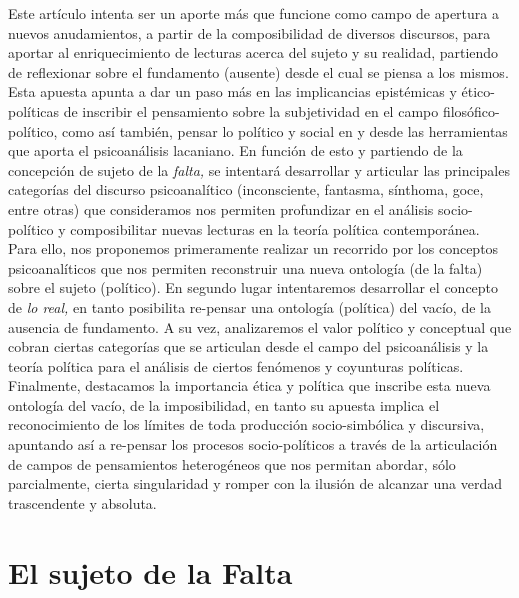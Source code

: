 Este artículo intenta ser un aporte más que funcione como campo de apertura a nuevos anudamientos, a partir de la composibilidad de diversos discursos, para aportar al enriquecimiento de lecturas acerca del sujeto y su realidad, partiendo de reflexionar sobre el fundamento (ausente) desde el cual se piensa a los mismos. Esta apuesta apunta a dar un paso más en las implicancias epistémicas y ético-políticas de inscribir el pensamiento sobre la subjetividad en el campo filosófico-político, como así también, pensar lo político y social en y desde las herramientas que aporta el psicoanálisis lacaniano. En función de esto y partiendo de la concepción de sujeto de la \emph{falta,} se intentará desarrollar y articular las principales categorías del discurso psicoanalítico (inconsciente, fantasma, sínthoma, goce, entre otras) que consideramos nos permiten profundizar en el análisis socio-político y composibilitar nuevas lecturas en la teoría política contemporánea. Para ello, nos proponemos primeramente realizar un recorrido por los conceptos psicoanalíticos que nos permiten reconstruir una nueva ontología (de la falta) sobre el sujeto (político). En segundo lugar intentaremos desarrollar el concepto de \emph{lo real,} en tanto posibilita re-pensar una ontología (política) del vacío, de la ausencia de fundamento. A su vez, analizaremos el valor político y conceptual que cobran ciertas categorías que se articulan desde el campo del psicoanálisis y la teoría política para el análisis de ciertos fenómenos y coyunturas políticas. Finalmente, destacamos la importancia ética y política que inscribe esta nueva ontología del vacío, de la imposibilidad, en tanto su apuesta implica el reconocimiento de los límites de toda producción socio-simbólica y discursiva, apuntando así a re-pensar los procesos socio-políticos a través de la articulación de campos de pensamientos heterogéneos que nos permitan abordar, sólo parcialmente, cierta singularidad y romper con la ilusión de alcanzar una verdad trascendente y absoluta.

\section{El sujeto de la Falta}

